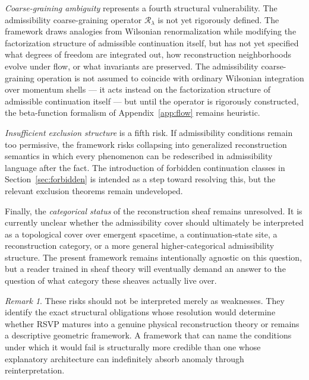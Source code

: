 \documentclass[11pt, a4paper]{article}
\theoremstyle{plain}
\theoremstyle{definition}
\theoremstyle{remark}
\newtheorem{remark}[theorem]{Remark}
\newcommand{\Rcoarse}{\mathcal{R}_\lambda}
\begin{document}
\emph{Coarse-graining ambiguity} represents a fourth structural vulnerability. The
admissibility coarse-graining operator $\Rcoarse$ is not yet rigorously defined. The
framework draws analogies from Wilsonian renormalization while modifying the
factorization structure of admissible continuation itself, but has not yet specified
what degrees of freedom are integrated out, how reconstruction neighborhoods evolve
under flow, or what invariants are preserved. The admissibility coarse-graining
operation is not assumed to coincide with ordinary Wilsonian integration over momentum
shells --- it acts instead on the factorization structure of admissible continuation
itself --- but until the operator is rigorously constructed, the beta-function
formalism of Appendix~\ref{app:flow} remains heuristic.

\emph{Insufficient exclusion structure} is a fifth risk. If admissibility conditions
remain too permissive, the framework risks collapsing into generalized reconstruction
semantics in which every phenomenon can be redescribed in admissibility language after
the fact. The introduction of forbidden continuation classes in
Section~\ref{sec:forbidden} is intended as a step toward resolving this, but the
relevant exclusion theorems remain undeveloped.

Finally, the \emph{categorical status} of the reconstruction sheaf remains
unresolved. It is currently unclear whether the admissibility cover should ultimately
be interpreted as a topological cover over emergent spacetime, a continuation-state
site, a reconstruction category, or a more general higher-categorical admissibility
structure. The present framework remains intentionally agnostic on this question, but
a reader trained in sheaf theory will eventually demand an answer to the question of
what category these sheaves actually live over.

\begin{remark}
These risks should not be interpreted merely as weaknesses. They identify the exact
structural obligations whose resolution would determine whether RSVP matures into a
genuine physical reconstruction theory or remains a descriptive geometric framework.
A framework that can name the conditions under which it would fail is structurally
more credible than one whose explanatory architecture can indefinitely absorb anomaly
through reinterpretation.
\end{remark}

\end{document}
